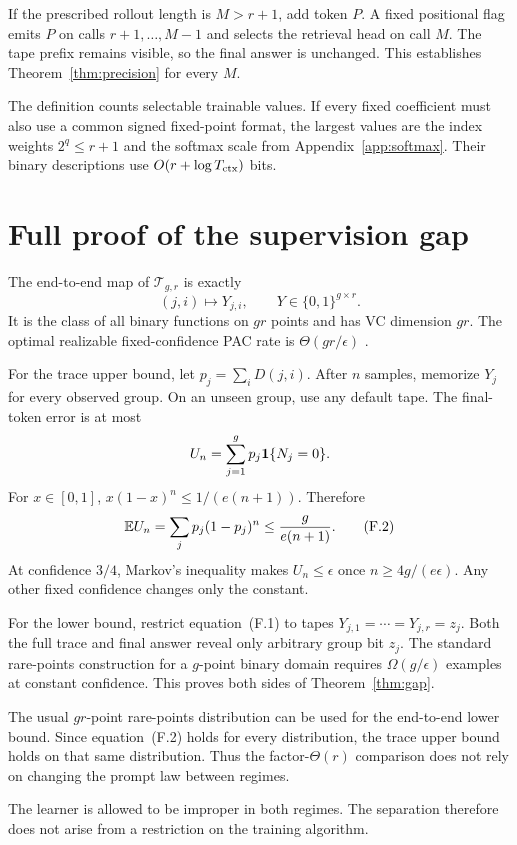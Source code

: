 If the prescribed rollout length is $M>r+1$, add token $P$. A fixed positional flag emits $P$ on
calls $r+1,\ldots,M-1$ and selects the retrieval head on call $M$. The tape prefix remains visible,
so the final answer is unchanged. This establishes Theorem~\ref{thm:precision} for every $M$.

The definition counts selectable trainable values. If every fixed coefficient must also use a
common signed fixed-point format, the largest values are the index weights $2^q\leq r+1$ and the
softmax scale from Appendix~\ref{app:softmax}. Their binary descriptions use
$O(r+\log T_{\rm ctx})$ bits.

\section{Full proof of the supervision gap}\label{app:gap}

The end-to-end map of $\mathcal T_{g,r}$ is exactly
\[
 (j,i)\mapsto Y_{j,i},
 \qquad Y\in\{0,1\}^{g\times r}.
 \tag{F.1}
\]
It is the class of all binary functions on $gr$ points and has VC dimension $gr$. The optimal
realizable fixed-confidence PAC rate is $\Theta(gr/\epsilon)$
\citep{hanneke2016optimal}.

For the trace upper bound, let $p_j=\sum_iD(j,i)$. After $n$ samples, memorize $Y_j$ for every
observed group. On an unseen group, use any default tape. The final-token error is at most
\[
 U_n=\sum_{j=1}^gp_j\mathbf 1\{N_j=0\}.
\]
For $x\in[0,1]$, $x(1-x)^n\leq1/(e(n+1))$. Therefore
\[
 \mathbb E U_n=\sum_jp_j(1-p_j)^n\leq\frac{g}{e(n+1)}.
 \tag{F.2}
\]
At confidence $3/4$, Markov's inequality makes $U_n\leq\epsilon$ once
$n\geq4g/(e\epsilon)$. Any other fixed confidence changes only the constant.

For the lower bound, restrict equation~(F.1) to tapes
$Y_{j,1}=\cdots=Y_{j,r}=z_j$. Both the full trace and final answer reveal only arbitrary group bit
$z_j$. The standard rare-points construction for a $g$-point binary domain requires
$\Omega(g/\epsilon)$ examples at constant confidence. This proves both sides of
Theorem~\ref{thm:gap}.

The usual $gr$-point rare-points distribution can be used for the end-to-end lower bound. Since
equation~(F.2) holds for every distribution, the trace upper bound holds on that same distribution.
Thus the factor-$\Theta(r)$ comparison does not rely on changing the prompt law between regimes.

The learner is allowed to be improper in both regimes. The separation therefore does not arise
from a restriction on the training algorithm.

